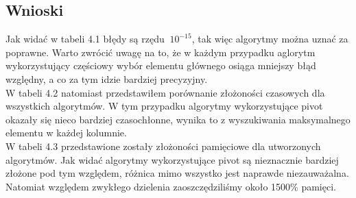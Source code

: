 \documentclass[11pt]{article}
\begin{document}
\begin{flushleft}
\begin{flushleft}
\section{Wnioski}
Jak widać w tabeli 4.1 błędy są rzędu $~ 10^{-15}$, tak więc algorytmy można uznać za poprawne.  Warto zwrócić uwagę na to, że w każdym przypadku aglorytm wykorzystujący częściowy wybór elementu głównego osiąga mniejszy błąd względny, a co za tym idzie bardziej precyzyjny. 
\\W tabeli 4.2 natomiast przedstawiłem porównanie złożoności czasowych dla wszystkich algorytmów. W tym przypadku algorytmy wykorzystujące pivot okazały się nieco bardziej czasochłonne, wynika to z wyszukiwania maksymalnego elementu w każdej kolumnie.
\\ W tabeli 4.3 przedstawione zostały złożoności pamięciowe dla utworzonych algorytmów. Jak widać algorytmy wykorzystujące pivot są nieznacznie bardziej złożone pod tym względem, różnica mimo wszystko jest naprawde niezauważalna. Natomiat względem zwykłego dzielenia zaoszczędziliśmy około 1500\% pamięci.
\end{flushleft}
\end{flushleft}
\end{document}
